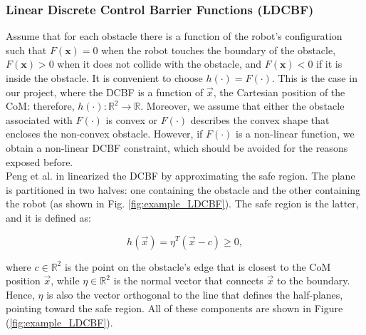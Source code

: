 \subsubsection{Linear Discrete Control Barrier Functions (LDCBF)}\label{subsec:ldcbf}
Assume that for each obstacle there is a function of the robot's configuration such that $F(\mathbf{x})=0$ when the robot touches the boundary of the obstacle, $F(\mathbf{x})>0$ when it does not collide with the obstacle, and $F(\mathbf{x})<0$ if it is inside the obstacle. It is convenient to choose $h(\cdot)=F(\cdot)$. This is the case in our project, where the DCBF is a function of $\vec{x}$, the Cartesian position of the CoM: therefore, $h(\cdot)\colon \mathbb{R}^2 \rightarrow \mathbb{R}$. Moreover, we assume that either the obstacle associated with $F(\cdot)$ is convex or $F(\cdot)$ describes the convex shape that encloses the non-convex obstacle.
However, if $F(\cdot)$ is a non-linear function, we obtain a non-linear DCBF constraint, which should be avoided for the reasons exposed before.\\
Peng et al. in \cite{peng_main_paper} linearized the DCBF by approximating the safe region. The plane is partitioned in two halves: one containing the obstacle and the other containing the robot (as shown in Fig. \ref{fig:example_LDCBF}).
The safe region is the latter, and it is defined as:

\begin{equation} \label{eq:std_ldcbf_def}
h\left(\vec{x}\right) = \eta^T \left(\vec{x} - c\right) \geq 0,
\end{equation}

where $c \in \mathbb{R}^2$ is the point on the obstacle's edge that is closest to the CoM position $\vec{x}$, while $\eta \in \mathbb{R}^2$ is the normal vector that connects $\vec{x}$ to the boundary. Hence, $\eta$ is also the vector orthogonal to the line that defines the half-planes, pointing toward the safe region. All of these components are shown in Figure (\ref{fig:example_LDCBF}).\\

